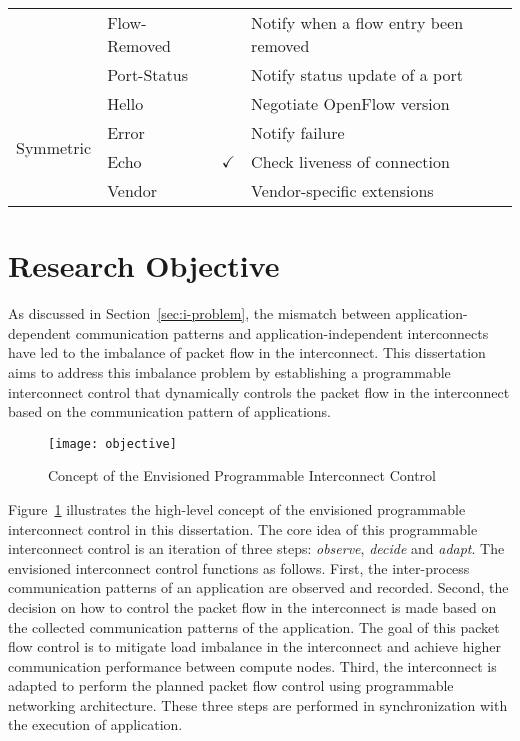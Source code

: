 \begin{table}[t]
\begin{tabular}{@{}llcl@{}}
                            & Flow-Removed     &              & Notify when a flow entry been removed \\
                            & Port-Status      &              & Notify status update of a port        \\ \midrule
\multirow{4}{*}{Symmetric}  & Hello            &              & Negotiate OpenFlow version            \\
                            & Error            &              & Notify failure                        \\
                            & Echo             & $\checkmark$ & Check liveness of connection          \\
                            & Vendor           &              & Vendor-specific extensions            \\ \bottomrule
\end{tabular}
\end{table}

\clearpage

\section{Research Objective}\label{sec:i-objective}

As discussed in Section~\ref{sec:i-problem}, the mismatch between
application-dependent communication patterns and application-independent
interconnects have led to the imbalance of packet flow in the interconnect.
This dissertation aims to address this imbalance problem by establishing a
programmable interconnect control that dynamically controls the packet flow in
the interconnect based on the communication pattern of applications.

\begin{figure}
    \centering
    \texttt{[image: objective]}
    \caption{Concept of the Envisioned Programmable Interconnect Control}%
    \label{fig:objective}
\end{figure}

Figure~\ref{fig:objective} illustrates the high-level concept of the
envisioned programmable interconnect control in this dissertation. The core
idea of this programmable interconnect control is an iteration of three steps:
\emph{observe}, \emph{decide} and \emph{adapt}. The envisioned interconnect
control functions as follows. First, the inter-process communication patterns
of an application are observed and recorded. Second, the decision on how to
control the packet flow in the interconnect is made based on the collected
communication patterns of the application. The goal of this packet flow control
is to mitigate load imbalance in the interconnect and achieve higher
communication performance between compute nodes. Third, the interconnect is
adapted to perform the planned packet flow control using programmable
networking architecture. These three steps are performed in synchronization
with the execution of application.


